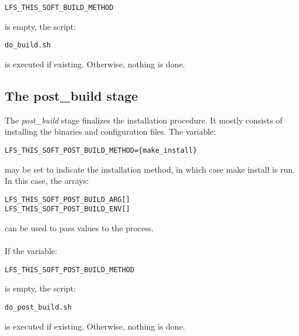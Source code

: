 \documentclass[a4paper, 11pt]{article}
\begin{document}
\begin{lstlisting}[frame=tb]
LFS_THIS_SOFT_BUILD_METHOD
\end{lstlisting}
is empty, the script:\\

\begin{lstlisting}[frame=tb]
do_build.sh
\end{lstlisting}
is executed if existing. Otherwise, nothing is done.

\subsection{The post\_build stage}
The \textit{post\_build} stage finalizes the installation procedure. It mostly
consists of installing the binaries and configuration files. The variable:\\

\begin{lstlisting}[frame=tb]
LFS_THIS_SOFT_POST_BUILD_METHOD={make_install}
\end{lstlisting}
may be set to indicate the installation method, in which case make install is
run. In this case, the arrays:\\

\begin{lstlisting}[frame=tb]
LFS_THIS_SOFT_POST_BUILD_ARG[]
LFS_THIS_SOFT_POST_BUILD_ENV[]
\end{lstlisting}
can be used to pass values to the process.

\paragraph{}
If the variable:\\

\begin{lstlisting}[frame=tb]
LFS_THIS_SOFT_POST_BUILD_METHOD
\end{lstlisting}
is empty, the script:\\

\begin{lstlisting}[frame=tb]
do_post_build.sh
\end{lstlisting}
is executed if existing. Otherwise, nothing is done.
\end{document}
